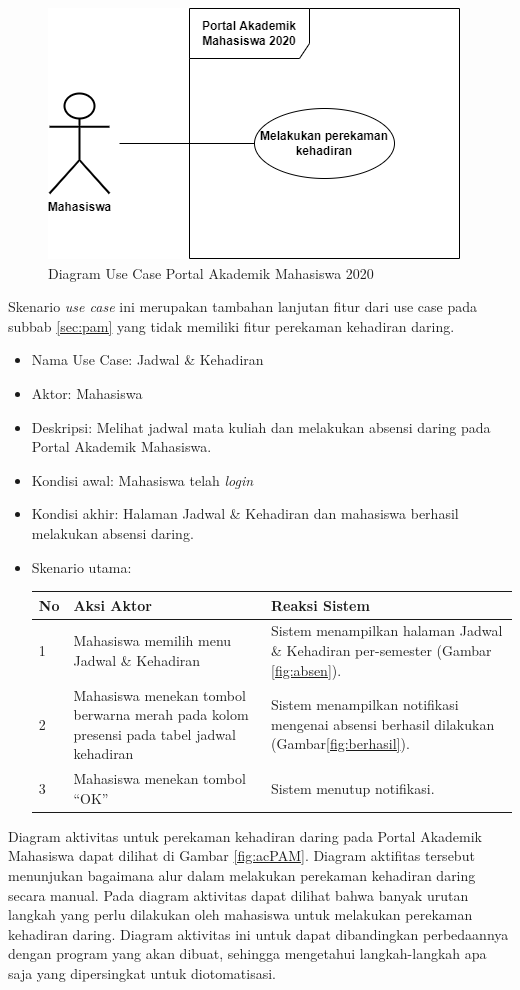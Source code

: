 \begin{figure}[H]
	\centering
	\includegraphics[scale=0.6]{Gambar/usecase2020.png}
	\caption{Diagram Use Case Portal Akademik Mahasiswa 2020} 
	\label{fig:usecase2020}
\end{figure}
Skenario \textit{use case} ini merupakan tambahan lanjutan fitur dari use case pada subbab \ref{sec:pam} yang tidak memiliki fitur perekaman kehadiran daring. 
\begin{itemize}
	\item Nama Use Case: Jadwal \& Kehadiran
	\item Aktor: Mahasiswa
	\item Deskripsi: Melihat jadwal mata kuliah dan melakukan absensi daring pada Portal Akademik Mahasiswa. 
	\item Kondisi awal: Mahasiswa telah \textit{login}
	\item Kondisi akhir: Halaman Jadwal \& Kehadiran dan mahasiswa berhasil melakukan absensi daring.
	\item Skenario utama:
	\begin{table}[h!]
		\centering
		\label{}
		\begin{tabular}{ | m{0.5cm} | m{7cm}| m{6cm} | } 
			\hline
			No & Aksi Aktor & Reaksi Sistem \\ 
			\hline
			1 & Mahasiswa memilih menu Jadwal \& Kehadiran & Sistem menampilkan halaman Jadwal \& Kehadiran per-semester (Gambar \ref{fig:absen}).
			\\ 
			\hline
			2 & Mahasiswa menekan tombol berwarna merah pada kolom presensi pada tabel jadwal kehadiran & Sistem menampilkan notifikasi mengenai absensi berhasil dilakukan (Gambar\ref{fig:berhasil}).
			\\ 
			\hline
			3 & Mahasiswa menekan tombol ``OK'' & Sistem menutup notifikasi.
			\\ 
			\hline
		\end{tabular}
	\end{table}	
\end{itemize}
Diagram aktivitas untuk perekaman kehadiran daring pada Portal Akademik Mahasiswa dapat dilihat di Gambar \ref{fig:acPAM}. Diagram aktifitas tersebut menunjukan bagaimana alur dalam melakukan perekaman kehadiran daring secara manual. Pada diagram aktivitas dapat dilihat bahwa banyak urutan langkah yang perlu dilakukan oleh mahasiswa untuk melakukan perekaman kehadiran daring. Diagram aktivitas ini untuk dapat dibandingkan perbedaannya dengan program yang akan dibuat, sehingga mengetahui langkah-langkah apa saja yang dipersingkat untuk diotomatisasi.

